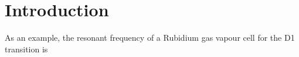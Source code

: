 \newpage
\section{Introduction}




As an example, the resonant frequency of a Rubidium gas vapour cell for the D1 transition is 